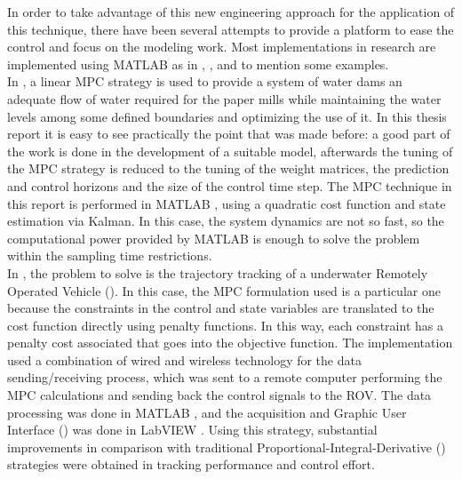 In order to take advantage of this new engineering approach for the application of this technique, there have been several attempts to provide a platform to ease the control and focus on the modeling work. Most implementations in research are implemented using MATLAB\textsuperscript{\textregistered} as in \cite{Gabrielsson2012}, \cite{Molero2011}, \cite{Kristoffersson2006} and \cite{Johansson2012} to mention some examples.\\

In \cite{Gabrielsson2012}, a linear MPC strategy is used to provide a system of water dams an adequate flow of water required for the paper mills while maintaining the water levels among some defined boundaries and optimizing the use of it. In this thesis report it is easy to see practically the point that was made before: a good part of the work is done in the development of a suitable model, afterwards the tuning of the MPC strategy is reduced to the tuning of the weight matrices, the prediction and control horizons and the size of the control time step. The MPC technique in this report is performed in MATLAB \textsuperscript{\textregistered}, using a quadratic cost function and state estimation via Kalman. In this case, the system dynamics are not so fast, so the computational power provided by MATLAB \textsuperscript{\textregistered} is enough to solve the problem within the sampling time restrictions.\\

In \cite{Molero2011}, the problem to solve is the trajectory tracking of a underwater Remotely Operated Vehicle (). In this case, the MPC formulation used is a particular one because the constraints in the control and state variables are translated to the cost function directly using penalty functions. In this way, each constraint has a penalty cost associated that goes into the objective function. The implementation used a combination of wired and wireless technology for the data sending/receiving process, which was sent to a remote computer performing the MPC calculations and sending back the control signals to the ROV. The data processing was done in MATLAB \textsuperscript{\textregistered}, and the acquisition and Graphic User Interface () was done in LabVIEW \texttrademark. Using this strategy, substantial improvements in comparison with traditional Proportional-Integral-Derivative () strategies were obtained in tracking performance and control effort.\\

